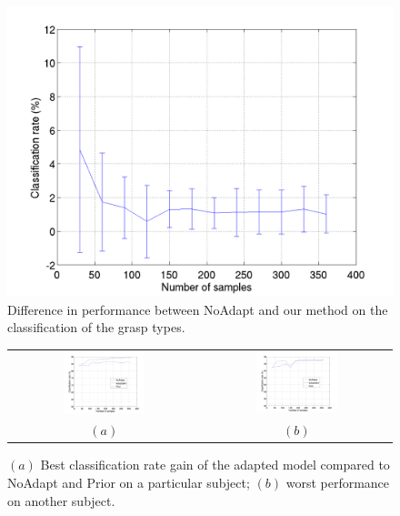 \begin{figure}[t]
  \centering
  \includegraphics[width=0.95\linewidth]{figs/exp1}
  \caption{Difference in performance between NoAdapt and our method  on the
 classification of the grasp types.}
  \label{fig:diff_cla}
\end{figure}

\begin{figure}[ht] \centering
  \begin{tabular}{cc}
    \includegraphics[width=0.45\textwidth]{figs/exp1_abs_best} &
    \includegraphics[width=0.45\textwidth]{figs/exp1_abs_worst} \\
    $(a)$ & $(b)$ \\
  \end{tabular}
  \caption{$(a)$ Best classification rate gain of the adapted model compared to
 NoAdapt and Prior on a particular subject; $(b)$ worst performance on another subject.}
  \label{fig:cla_abs}
\end{figure}


